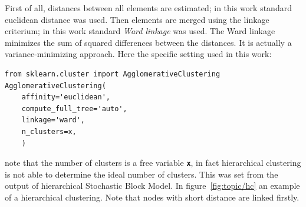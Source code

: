 First of all, distances between all elements are estimated; in this work standard euclidean distance was used. Then elements are merged using the linkage criterium; in this work standard \textit{Ward linkage} was used. The Ward linkage minimizes the sum of squared differences between the distances. It is actually a variance-minimizing approach. Here the specific setting used in this work:
\begin{lstlisting}[style=mypython]
from sklearn.cluster import AgglomerativeClustering
AgglomerativeClustering(
    affinity='euclidean',
    compute_full_tree='auto',
    linkage='ward',
    n_clusters=x,
    )
\end{lstlisting}
note that the number of clusters is a free variable \texttt{\textbf{x}}, in fact hierarchical clustering is not able to determine the ideal number of clusters. This was set from the output of hierarchical Stochastic Block Model.
In figure~\ref{fig:topic/hc} an example of a hierarchical clustering. Note that nodes with short distance are linked firstly.
